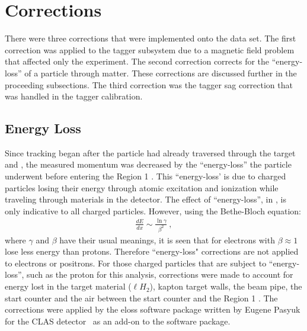 \section{ Corrections}\label{sec:analysis.corrections}
There were three corrections that were implemented onto the  data set. The first correction was applied to the tagger subsystem due to a magnetic field problem that affected only the  experiment. The second correction corrects for the ``energy-loss'' of a particle through matter. These corrections are discussed further in the proceeding subsections. The third correction was the tagger sag correction that was handled in the tagger calibration.
\subsection{Energy Loss}\label{sec:analysis.corrections.eloss}

Since tracking began after the particle had already traversed through the target and , the measured momentum was decreased by the ``energy-loss'' the particle underwent before entering the Region 1 . This ``energy-loss' is due to charged particles losing their energy through atomic excitation and ionization while traveling through materials in the  detector. The effect of ``energy-loss'', in , is only indicative to all charged particles. However, using the Bethe-Bloch equation:
\begin{align}
\frac{dE}{dx} \sim \frac{\ln \gamma}{\beta^2} \ ,
\end{align}
where $\gamma$ and $\beta$ have their usual meanings, it is seen that for electrons with $\beta \approx 1$ lose less energy than protons. Therefore ``energy-loss" corrections are not applied to electrons or positrons. For those charged particles that are subject to ``energy-loss'', such as the proton for this analysis, corrections were made to account for energy lost in the target material ($\ell H_2$), kapton target walls, the beam pipe, the start counter and the air between the start counter and the Region 1 . The corrections were applied by the eloss software package written by Eugene Pasyuk for the CLAS detector~\cite{clas.eloss} as an add-on to the  software package.

